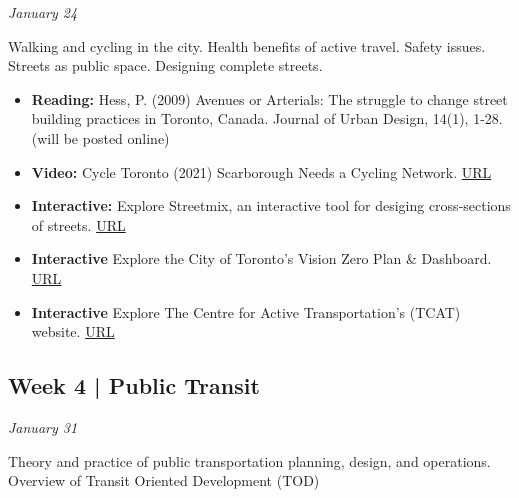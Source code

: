 \documentclass[11pt]{article}
\begin{document}
	\textit{January 24}
	
	Walking and cycling in the city. Health benefits of active travel. Safety issues. Streets as public space. Designing complete streets. 
	
	\begin{itemize}
		\item \textbf{Reading:} Hess, P. (2009) Avenues or Arterials: The struggle to change street building practices in Toronto, Canada. Journal of Urban Design, 14(1), 1-28. (will be posted online)
		
		\item \textbf{Video:} Cycle Toronto (2021) Scarborough Needs a Cycling Network. \href{https://www.youtube.com/watch?v=gnwhc9fBa5k}{URL}
				
		\item \textbf{Interactive:} Explore Streetmix, an interactive tool for desiging cross-sections of streets. \href{https://streetmix.net}{URL}
		
		\item \textbf{Interactive} Explore the City of Toronto's Vision Zero Plan \& Dashboard. \href{https://www.toronto.ca/services-payments/streets-parking-transportation/road-safety/vision-zero/vision-zero-dashboard/}{URL}
		
		\item \textbf{Interactive} Explore The Centre for Active Transportation's (TCAT) website. \href{https://www.tcat.ca/}{URL}
		
	\end{itemize}
	
	
	

	

		
	\subsection*{Week 4 | Public Transit}
	
	\textit{January 31}
	
	Theory and practice of public transportation planning, design, and operations. Overview of Transit Oriented Development (TOD)
	
\end{document}
